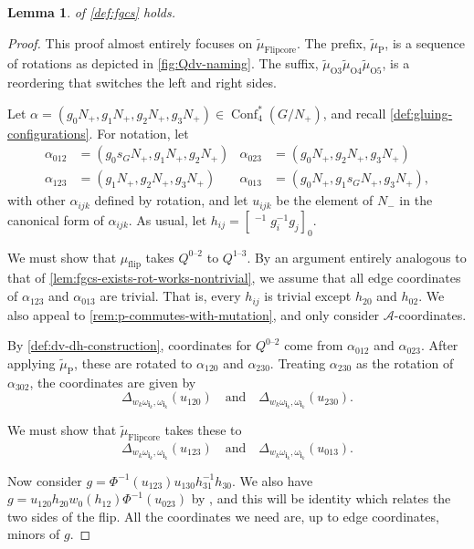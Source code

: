 \documentclass{amsart}
\theoremstyle{plain}
\newtheorem{lemma}[theorem]{Lemma}
\theoremstyle{definition}
\theoremstyle{remark}
\newcommand{\Qdv}{Q^{0\text{--}2}}
\newcommand{\Qdh}{Q^{1\text{--}3}}
\newcommand{\fundamentalweight}{\omega}
\newcommand{\genminoryz}[3]{\Delta_{{#1} \fundamentalweight_{#3}, {#2}%
    \fundamentalweight_{#3}}}
\newcommand{\lifttoG}[1]{{\mathop{\overline{#1}}}}
\newcommand{\word}[1]{\mathbf{#1}}
\newcommand{\muflip}{{\mu_{\text{flip}}}}
\newcommand{\muint}[1]{\widetilde{\mu}_{\text{#1}}}
\newcommand{\muflipcore}{\muint{Flipcore}}
\newcommand{\muP}{\muint{P}}
\DeclareMathOperator{\Conf}{Conf}
\begin{document}
  \begin{lemma}
    \label{lem:fgcs-exists-flip-works}
     of \cref{def:fgcs} holds.
  \end{lemma}
  \begin{proof}
    This proof almost entirely focuses on $\muflipcore$. The prefix,
    $\muint{P}$, is a sequence of rotations as depicted in
    \cref{fig:Qdv-naming}. The suffix, $\muint{O3} \muint{O4}
    \muint{O5}$, is a reordering that switches the left and right sides.

    Let $\alpha = (g_0 N_{+}, g_1 N_{+}, g_2 N_{+}, g_3 N_{+}) \in
    \Conf_4^{\ast}(G/N_{+})$, and recall
    \cref{def:gluing-configurations}. For notation, let
    \begin{align*}
      \alpha_{012} &= (g_0 s_G N_{+}, g_1 N_{+}, g_2 N_{+}) & \alpha_{023} &= (g_0 N_{+}, g_2 N_{+}, g_3 N_{+}) \\
      \alpha_{123} &= (g_1 N_{+}, g_2 N_{+}, g_3 N_{+}) & \alpha_{013} &= (g_0 N_{+}, g_1 s_G N_{+}, g_3 N_{+}),
    \end{align*}
    with other $\alpha_{ijk}$ defined by rotation, and let $u_{ijk}$ be
    the element of $N_{-}$ in the canonical form of $\alpha_{ijk}$. As
    usual, let $h_{ij} = [ \lifttoG{w_0}^{-1} g_i^{-1} g_j]_{0}$.

    We must show that $\muflip$ takes $\Qdv$ to $\Qdh$. By an argument
    entirely analogous to that of
    \cref{lem:fgcs-exists-rot-works-nontrivial}, we assume that all edge
    coordinates of $\alpha_{123}$ and $\alpha_{013}$ are trivial. That
    is, every $h_{ij}$ is trivial except $h_{20}$ and $h_{02}$. We also
    appeal to \cref{rem:p-commutes-with-mutation}, and only consider
    $\mathcal{A}$-coordinates.

    By \cref{def:dv-dh-construction}, coordinates for $\Qdv$ come from
    $\alpha_{012}$ and $\alpha_{023}$. After applying $\muP$, these are
    rotated to $\alpha_{120}$ and $\alpha_{230}$. Treating
    $\alpha_{230}$ as the rotation of $\alpha_{302}$, the coordinates
    are given by \[ \genminoryz{w_k}{}{\word{i}_k}(u_{120}) \quad
      \text{and} \quad \genminoryz{w_k}{}{\word{i}_k}(u_{230}). \]

    We must show that $\muflipcore$ takes these to \[
      \genminoryz{w_k}{}{\word{i}_k}(u_{123}) \quad \text{and} \quad
      \genminoryz{w_k}{}{\word{i}_k}(u_{013}). \]

    Now consider $g = \Phi^{-1}(u_{123}) u_{130} h_{31}^{-1} h_{30}$. We
    also have $g = u_{120} h_{20} w_0(h_{12}) \Phi^{-1}(u_{023})$ by
    \cite[Proposition~5.14]{zickert2016}, and this will be identity
    which relates the two sides of the flip. All the coordinates we need
    are, up to edge coordinates, minors of $g$.


\end{proof}
\end{document}
